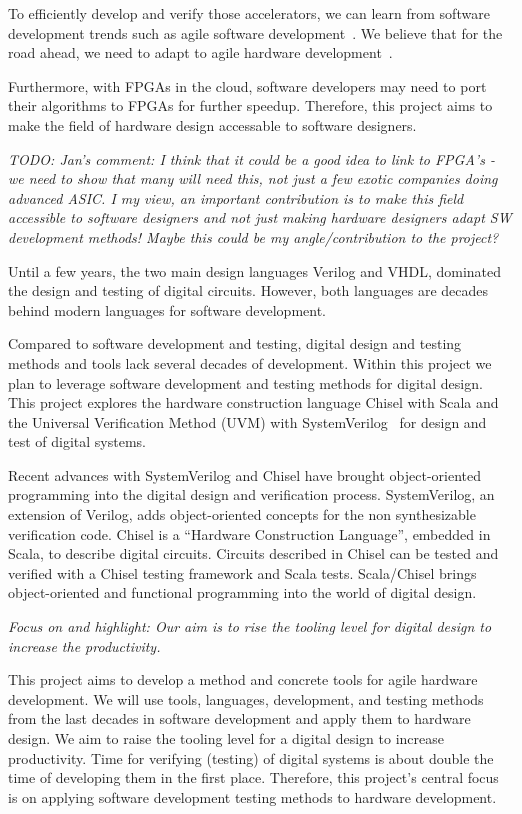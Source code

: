 \documentclass[fleqn,12pt]{article}
\newcommand{\todo}[1]{{\it TODO: #1}}
\begin{document}
To efficiently develop and verify those accelerators, we can learn from software development trends such as agile software development~\cite{agile:manifesto}.
We believe that for the road ahead, we need to adapt to agile hardware development~\cite{henn-patt:turing:2019}.

Furthermore, with FPGAs in the cloud, software developers may need to port their algorithms
to FPGAs for further speedup. Therefore, this project aims to make the field of hardware design
accessable to software designers.

\todo{Jan's comment: I think that it could be a good idea to link to FPGA's - we need to show that many will need this, not just a few exotic companies doing advanced ASIC. 
I my view, an important contribution is to make this field accessible to software designers and not just making hardware designers adapt SW development methods! Maybe this could be my angle/contribution to the project?}

Until a few years, the two main design languages Verilog and VHDL, dominated the
design and testing of digital circuits. However, both languages are decades behind
modern languages for software development.

Compared to software development and testing, digital design and testing methods
and tools lack several decades of development. Within this project we plan to
leverage software development and testing methods for digital design.
This project explores the hardware construction language Chisel with Scala
and the Universal Verification Method (UVM) with SystemVerilog~\cite{SystemVerilog} for
design and test of digital systems.

Recent advances with SystemVerilog and Chisel \cite{chisel:dac2012, chisel:book} have brought object-oriented programming
into the digital design and verification process. SystemVerilog, an extension of Verilog, adds object-oriented concepts for the non synthesizable verification code.
Chisel is a ``Hardware Construction Language'', embedded in Scala, to describe digital circuits.
Circuits described in Chisel can be tested and verified with a Chisel testing framework and Scala tests.
Scala/Chisel brings object-oriented and functional programming into the world of
digital design.


\emph{Focus on and highlight: Our aim is to rise the tooling level for digital design to increase
the productivity.}

This project aims to develop a method and concrete tools for agile hardware development.
We will use tools, languages, development, and testing methods from the last decades in
software development and apply them to hardware design.
We aim to raise the tooling level for a digital design to increase productivity.
Time for verifying (testing) of digital systems is about double the time of developing
them in the first place.
Therefore, this project's central focus is on applying software development
testing methods to hardware development.
\end{document}
